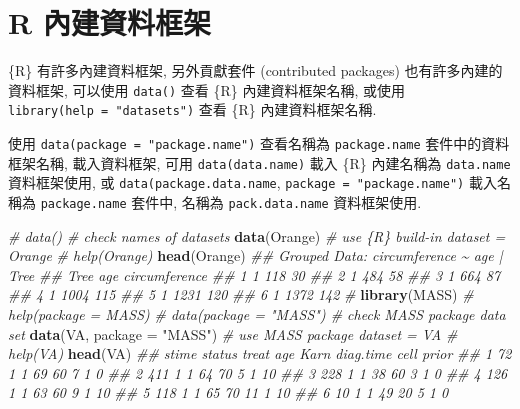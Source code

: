 \documentclass[
]{book}
\newenvironment{Shaded}{\begin{snugshade}}{\end{snugshade}}
\newcommand{\CommentTok}[1]{\textcolor[rgb]{0.56,0.35,0.01}{\textit{#1}}}
\newcommand{\DataTypeTok}[1]{\textcolor[rgb]{0.13,0.29,0.53}{#1}}
\newcommand{\KeywordTok}[1]{\textcolor[rgb]{0.13,0.29,0.53}{\textbf{#1}}}
\newcommand{\NormalTok}[1]{#1}
\newcommand{\StringTok}[1]{\textcolor[rgb]{0.31,0.60,0.02}{#1}}
\begin{document}
\hypertarget{r-ux5167ux5efaux8cc7ux6599ux6846ux67b6}{%
\section{R 內建資料框架}\label{r-ux5167ux5efaux8cc7ux6599ux6846ux67b6}}

\{R\} 有許多內建資料框架,
另外貢獻套件 (contributed packages) 也有許多內建的資料框架,
可以使用
\texttt{data()}
查看 \{R\} 內建資料框架名稱,
或使用 \texttt{library(help\ =\ "datasets")}
查看 \{R\} 內建資料框架名稱.

使用 \texttt{data(package\ =\ "package.name")}
查看名稱為
\texttt{package.name} 套件中的資料框架名稱,
載入資料框架,
可用 \texttt{data(data.name)}
載入 \{R\} 內建名稱為
\texttt{data.name}
資料框架使用,
或
\texttt{data(package.data.name},
\texttt{package\ =\ "package.name")}
載入名稱為
\texttt{package.name} 套件中,
名稱為
\texttt{pack.data.name} 資料框架使用.

\begin{Shaded}
\begin{Highlighting}[]
\CommentTok{\# data()     \# check names of datasets }
\KeywordTok{data}\NormalTok{(Orange) }\CommentTok{\# use \{R\} build{-}in dataset = Orange}
\CommentTok{\# help(Orange)}
\KeywordTok{head}\NormalTok{(Orange)}
\CommentTok{\#\# Grouped Data: circumference \textasciitilde{} age | Tree}
\CommentTok{\#\#   Tree  age circumference}
\CommentTok{\#\# 1    1  118            30}
\CommentTok{\#\# 2    1  484            58}
\CommentTok{\#\# 3    1  664            87}
\CommentTok{\#\# 4    1 1004           115}
\CommentTok{\#\# 5    1 1231           120}
\CommentTok{\#\# 6    1 1372           142}
\CommentTok{\#}
\KeywordTok{library}\NormalTok{(MASS)}
\CommentTok{\# help(package = MASS)}
\CommentTok{\# data(package = "MASS")     \# check MASS package data set}
\KeywordTok{data}\NormalTok{(VA, }\DataTypeTok{package =} \StringTok{"MASS"}\NormalTok{)   }\CommentTok{\# use MASS package dataset = VA}
\CommentTok{\# help(VA)}
\KeywordTok{head}\NormalTok{(VA)}
\CommentTok{\#\#   stime status treat age Karn diag.time cell prior}
\CommentTok{\#\# 1    72      1     1  69   60         7    1     0}
\CommentTok{\#\# 2   411      1     1  64   70         5    1    10}
\CommentTok{\#\# 3   228      1     1  38   60         3    1     0}
\CommentTok{\#\# 4   126      1     1  63   60         9    1    10}
\CommentTok{\#\# 5   118      1     1  65   70        11    1    10}
\CommentTok{\#\# 6    10      1     1  49   20         5    1     0}
\end{Highlighting}
\end{Shaded}
\end{document}
